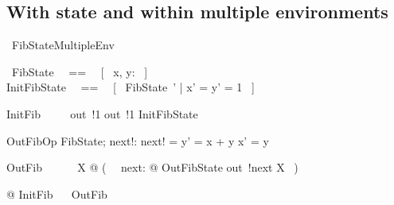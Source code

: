 \documentclass{article}
\begin{document}
\begin{circus}
    \circend
\end{circus}

\subsection{With state and within multiple environments}

\begin{circus}
    \circprocess\ FibStateMultipleEnv ~~\circdef~~ \circbegin
\end{circus}

\begin{circusaction}
    \circstate\ FibState ~~==~~ [~ x, y: \nat ~] \\
    InitFibState ~~==~~ [~ FibState~' | x' = y' = 1 ~]
\end{circusaction}

\begin{circusaction}
    InitFib ~~\circdef~~ out~!1 \then out~!1 \then InitFibState
\end{circusaction}

\begin{schema}{OutFibOp}
    \Delta FibState; next!: \nat
\where
    next! = y' = x + y \land x' = y
\end{schema}

\begin{circusaction}
    OutFib ~~\circdef~~ \circmu\ X @ (~ \circvar\ next: \nat @ OutFibState \circseq out~!next \then X ~)
\end{circusaction}

\begin{circusaction}
    @ InitFib ~\circseq~ OutFib 
\end{circusaction}

\begin{circus}
    \circend
\end{circus}
\end{document}
